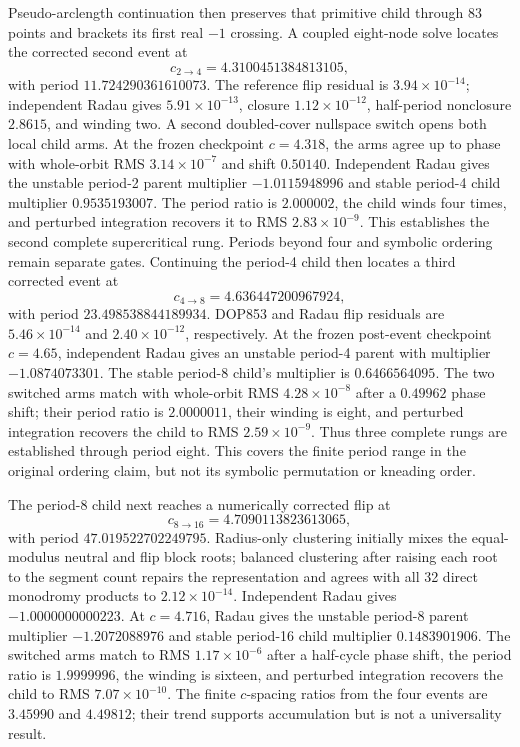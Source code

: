 Pseudo-arclength continuation then preserves that primitive child through 83
points and brackets its first real $-1$ crossing.  A coupled eight-node solve
locates the corrected second event at
\[
c_{2\to4}=4.3100451384813105,
\]
with period $11.724290361610073$.  The reference flip residual is
$3.94\times10^{-14}$; independent Radau gives $5.91\times10^{-13}$, closure
$1.12\times10^{-12}$, half-period nonclosure $2.8615$, and winding two.  A
second doubled-cover nullspace switch opens both local child arms.  At the
frozen checkpoint $c=4.318$, the arms agree up to phase with whole-orbit RMS
$3.14\times10^{-7}$ and shift $0.50140$.  Independent Radau gives the unstable
period-2 parent multiplier $-1.0115948996$ and stable period-4 child multiplier
$0.9535193007$.  The period ratio is $2.000002$, the child winds four times,
and perturbed integration recovers it to RMS $2.83\times10^{-9}$.  This
establishes the second complete supercritical rung.  Periods beyond four and
symbolic ordering remain separate gates.  Continuing the period-4 child then
locates a third corrected event at
\[
c_{4\to8}=4.636447200967924,
\]
with period $23.498538844189934$.  DOP853 and Radau flip residuals are
$5.46\times10^{-14}$ and $2.40\times10^{-12}$, respectively.  At the frozen
post-event checkpoint $c=4.65$, independent Radau gives an unstable period-4
parent with multiplier $-1.0874073301$.  The stable period-8 child's multiplier
is $0.6466564095$.  The two switched arms match with whole-orbit RMS
$4.28\times10^{-8}$ after a $0.49962$ phase shift; their period ratio is
$2.0000011$, their winding is eight, and perturbed integration recovers the
child to RMS $2.59\times10^{-9}$.  Thus three complete rungs are established
through period eight.  This covers the finite period range in the original
ordering claim, but not its symbolic permutation or kneading order.

The period-8 child next reaches a numerically corrected flip at
\[
c_{8\to16}=4.7090113823613065,
\]
with period $47.019522702249795$.  Radius-only clustering initially mixes the
equal-modulus neutral and flip block roots; balanced clustering after raising
each root to the segment count repairs the representation and agrees with all
32 direct monodromy products to $2.12\times10^{-14}$.  Independent Radau gives
$-1.0000000000223$.  At $c=4.716$, Radau gives the unstable period-8 parent
multiplier $-1.2072088976$ and stable period-16 child multiplier
$0.1483901906$.  The switched arms match to RMS $1.17\times10^{-6}$ after a
half-cycle phase shift, the period ratio is $1.9999996$, the winding is
sixteen, and perturbed integration recovers the child to RMS
$7.07\times10^{-10}$.  The finite $c$-spacing ratios from the four events are
$3.45990$ and $4.49812$; their trend supports accumulation but is not a
universality result.

